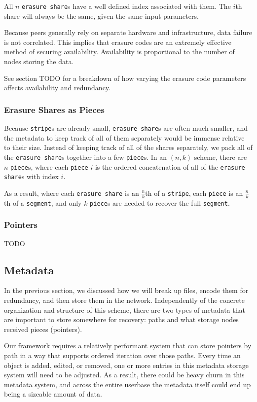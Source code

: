 \documentclass[a4paper,10pt]{article}
\newcommand{\x}[1]{{\tt #1}}
\newcommand{\todo}[1]{{\color{red} TODO #1}}
\begin{document}
All $n$ \x{erasure share}s have a well defined index associated with them. The
$i$th share will always be the same, given the same input parameters.

Because peers generally rely on separate hardware and infrastructure, data
failure is not correlated. This implies that erasure codes are an extremely
effective method of securing availability. Availability is proportional to the
number of nodes storing the data.

See section \todo{} for a breakdown of how varying the erasure code parameters
affects availability and redundancy.

\subsubsection{Erasure Shares as Pieces}

Because \x{stripe}s are already small, \x{erasure share}s are often
much smaller, and the metadata to keep track of all of them separately would be
immense relative to their size. Instead of keeping track of all of the shares
separately, we pack all of the \x{erasure share}s together into a few
\x{piece}s. In an $(n, k)$ scheme, there are $n$ \x{piece}s, where each
\x{piece} $i$ is the ordered concatenation of all of the \x{erasure share}s
with index $i$.

As a result, where each \x{erasure share} is an $\frac{n}{k}$th of a \x{stripe},
each \x{piece} is an $\frac{n}{k}$th of a \x{segment}, and only $k$ \x{piece}s
are needed to recover the full \x{segment}.

\subsubsection{Pointers}

\todo{}

\subsection{Metadata}

In the previous section, we discussed how we will break up files,
encode them for redundancy, and then store them in the network. Independently
of the concrete organization and structure of this scheme, there are two
types of metadata that are important to store somewhere for recovery:
paths and what storage nodes received pieces (pointers).

Our framework requires a relatively performant system that can store
pointers by path in a way that supports ordered iteration over those paths.
Every time an object is added, edited, or removed, one or more entries in this
metadata storage system will need to be adjusted. As a result, there could be
heavy churn in this metadata system, and across the entire
userbase the metadata itself could end up being a sizeable amount of data.
\end{document}
